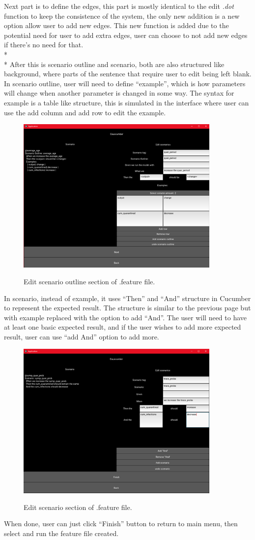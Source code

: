 \noindent 
Next part is to define the edges, this part is mostly identical to the edit \textsl{.dot} function to keep the consistence of the system, the only new addition is a new option allow user to add new edges. This new function is added due to the potential need for user to add extra edges, user can choose to not add new edges if there’s no need for that.\\*\\*
After this is scenario outline and scenario, both are also structured like background, where parts of the sentence that require user to edit being left blank. In scenario outline, user will need to define “example”, which is how parameters will change when another parameter is changed in some way. The syntax for example is a table like structure, this is simulated in the interface where user can use the add column and add row to edit the example. 
\begin{figure}[H]
	\centering
	\includegraphics[width=10cm]{figures/editFeature2Screen.png}\\
	\caption{Edit scenario outline section of .feature file.}
	\label{fig:figure17}
\end{figure}
\noindent 
In scenario, instead of example, it uses “Then” and “And” structure in Cucumber to represent the expected result. The structure is similar to the previous page but with example replaced with the option to add “And”. The user will need to have at least one basic expected result, and if the user wishes to add more expected result, user can use “add And” option to add more. 
\begin{figure}[H]
	\centering
	\includegraphics[width=10cm]{figures/editFeature3Screen.png}\\
	\caption{Edit scenario section of .feature file.}
	\label{fig:figure18}
\end{figure}
\noindent 
When done, user can just click “Finish” button to return to main menu, then select and run the feature file created.








